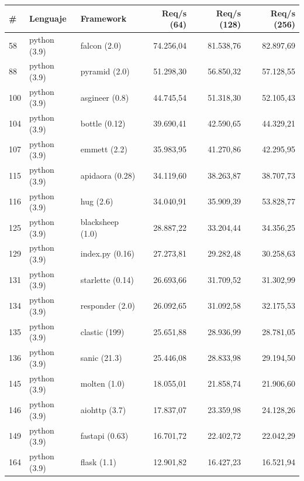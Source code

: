 \begin{table}[!ht]
    \begin{center}
        \begin{tabular}{|l|l|l|r|r|r|}
            \hline
            \# & Lenguaje & Framework & Req/s (64) & Req/s (128) & Req/s (256) \\ \hline
            58 & python (3.9) & falcon (2.0) & 74.256,04 & 81.538,76 & 82.897,69 \\ \hline
            88 & python (3.9) & pyramid (2.0) & 51.298,30 & 56.850,32 & 57.128,55 \\ \hline
            100 & python (3.9) & asgineer (0.8) & 44.745,54 & 51.318,30 & 52.105,43 \\ \hline
            104 & python (3.9) & bottle (0.12) & 39.690,41 & 42.590,65 & 44.329,21 \\ \hline
            107 & python (3.9) & emmett (2.2) & 35.983,95 & 41.270,86 & 42.295,95 \\ \hline
            115 & python (3.9) & apidaora (0.28) & 34.119,60 & 38.263,87 & 38.707,73 \\ \hline
            116 & python (3.9) & hug (2.6) & 34.040,91 & 35.909,39 & 53.828,77 \\ \hline
            125 & python (3.9) & blacksheep (1.0) & 28.887,22 & 33.204,44 & 34.356,25 \\ \hline
            129 & python (3.9) & index.py (0.16) & 27.273,81 & 29.282,48 & 30.258,63 \\ \hline
            131 & python (3.9) & starlette (0.14) & 26.693,66 & 31.709,52 & 31.302,99 \\ \hline
            134 & python (3.9) & responder (2.0) & 26.092,65 & 31.092,58 & 32.175,53 \\ \hline
            135 & python (3.9) & clastic (199) & 25.651,88 & 28.936,99 & 28.781,05 \\ \hline
            136 & python (3.9) & sanic (21.3) & 25.446,08 & 28.833,98 & 29.194,50 \\ \hline
            145 & python (3.9) & molten (1.0) & 18.055,01 & 21.858,74 & 21.906,60 \\ \hline
            146 & python (3.9) & aiohttp (3.7) & 17.837,07 & 23.359,98 & 24.128,26 \\ \hline
            149 & python (3.9) & fastapi (0.63) & 16.701,72 & 22.402,72 & 22.042,29 \\ \hline
            164 & python (3.9) & flask (1.1) & 12.901,82 & 16.427,23 & 16.521,94 \\ \hline

\end{tabular}
\end{center}
\end{table}
